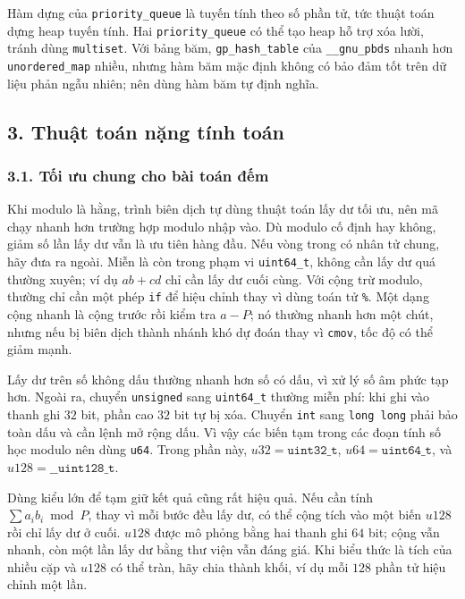 \documentclass[11pt]{article}
\begin{document}
Hàm dựng của \texttt{priority\_queue} là tuyến tính theo số phần tử, tức thuật
toán dựng heap tuyến tính. Hai \texttt{priority\_queue} có thể tạo heap hỗ trợ
xóa lười, tránh dùng \texttt{multiset}. Với bảng băm, \texttt{gp\_hash\_table}
của \texttt{\_\_gnu\_pbds} nhanh hơn \texttt{unordered\_map} nhiều, nhưng hàm
băm mặc định không có bảo đảm tốt trên dữ liệu phản ngẫu nhiên; nên dùng hàm
băm tự định nghĩa.

\subsection*{3. Thuật toán nặng tính toán}

\subsubsection*{3.1. Tối ưu chung cho bài toán đếm}

Khi modulo là hằng, trình biên dịch tự dùng thuật toán lấy dư tối ưu, nên mã
chạy nhanh hơn trường hợp modulo nhập vào. Dù modulo cố định hay không, giảm
số lần lấy dư vẫn là ưu tiên hàng đầu. Nếu vòng trong có nhân tử chung, hãy đưa
ra ngoài. Miễn là còn trong phạm vi \texttt{uint64\_t}, không cần lấy dư quá
thường xuyên; ví dụ \(a b+c d\) chỉ cần lấy dư cuối cùng. Với cộng trừ modulo,
thường chỉ cần một phép \texttt{if} để hiệu chỉnh thay vì dùng toán tử
\texttt{\%}. Một dạng cộng nhanh là cộng trước rồi kiểm tra \(a-P\); nó thường
nhanh hơn một chút, nhưng nếu bị biên dịch thành nhánh khó dự đoán thay vì
\texttt{cmov}, tốc độ có thể giảm mạnh.

Lấy dư trên số không dấu thường nhanh hơn số có dấu, vì xử lý số âm phức tạp
hơn. Ngoài ra, chuyển \texttt{unsigned} sang \texttt{uint64\_t} thường miễn phí:
khi ghi vào thanh ghi \(32\) bit, phần cao \(32\) bit tự bị xóa. Chuyển
\texttt{int} sang \texttt{long long} phải bảo toàn dấu và cần lệnh mở rộng dấu.
Vì vậy các biến tạm trong các đoạn tính số học modulo nên dùng \texttt{u64}.
Trong phần này, \(u32=\texttt{uint32\_t}\), \(u64=\texttt{uint64\_t}\), và
\(u128=\texttt{\_\_uint128\_t}\).

Dùng kiểu lớn để tạm giữ kết quả cũng rất hiệu quả. Nếu cần tính
\(\sum a_i b_i\bmod P\), thay vì mỗi bước đều lấy dư, có thể cộng tích vào một
biến \(u128\) rồi chỉ lấy dư ở cuối. \(u128\) được mô phỏng bằng hai thanh ghi
\(64\) bit; cộng vẫn nhanh, còn một lần lấy dư bằng thư viện vẫn đáng giá. Khi
biểu thức là tích của nhiều cặp và \(u128\) có thể tràn, hãy chia thành khối,
ví dụ mỗi \(128\) phần tử hiệu chỉnh một lần.
\end{document}
